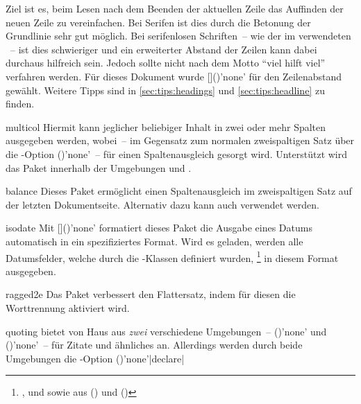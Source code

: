 \begin{packages}
  Ziel ist es, beim Lesen nach dem Beenden der aktuellen Zeile das Auffinden 
  der neuen Zeile zu vereinfachen. Bei Serifen ist dies durch die Betonung der 
  Grundlinie sehr gut möglich. Bei serifenlosen Schriften~-- wie der im \TUDCD 
  verwendeten \Univers~-- ist dies schwieriger und ein erweiterter Abstand der 
  Zeilen kann dabei durchaus hilfreich sein. Jedoch sollte nicht nach dem Motto 
  \enquote{viel hilft viel} verfahren werden. Für dieses Dokument wurde 
  []()'none' für den 
  Zeilenabstand gewählt. Weitere Tipps sind in \autoref{sec:tips:headings} und 
  \autoref{sec:tips:headline} zu finden.
\item[multicol]
  Hiermit kann jeglicher beliebiger Inhalt in zwei oder mehr Spalten ausgegeben 
  werden, wobei~-- im Gegensatz zum normalen zweispaltigen Satz über die
  \KOMAScript-Option ()'none'~-- für einen 
  Spaltenausgleich gesorgt wird. Unterstützt wird das Paket innerhalb der 
  Umgebungen  und .
\item[balance]
  Dieses Paket ermöglicht einen Spaltenausgleich im zweispaltigen Satz auf der 
  letzten Dokumentseite. Alternativ dazu kann auch  verwendet 
  werden.
\item[isodate]
  Mit []()'none' formatiert 
  dieses Paket die Ausgabe eines Datums automatisch in ein spezifiziertes 
  Format. Wird es geladen, werden alle Datumsfelder, welche durch die 
  \TUDScript-Klassen definiert wurden,%
  \footnote{%
    ,  und  sowie aus 
     () und 
    ()%
  }
  in diesem Format ausgegeben.
\item[ragged2e]
  Das Paket verbessert den Flattersatz, indem für diesen die Worttrennung 
  aktiviert wird.
\item[quoting]
   bietet von Haus aus \emph{zwei} verschiedene Umgebungen~-- 
  ()'none' und 
  ()'none'~-- für Zitate und 
  ähnliches an. Allerdings werden durch beide Umgebungen die \KOMAScript-Option 
  ()'none'|declare|

\end{packages}

